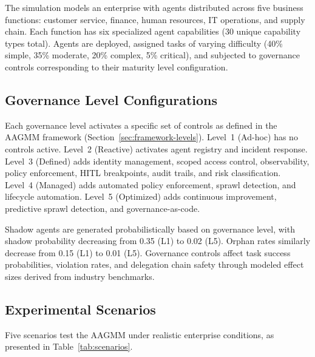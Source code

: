 \documentclass[ai,article,submit,pdftex,moreauthors]{Definitions/mdpi}
\begin{document}
The simulation models an enterprise with agents distributed across five business functions: customer service, finance, human resources, IT operations, and supply chain. Each function has six specialized agent capabilities (30 unique capability types total). Agents are deployed, assigned tasks of varying difficulty (40\% simple, 35\% moderate, 20\% complex, 5\% critical), and subjected to governance controls corresponding to their maturity level configuration.

\subsection{Governance Level Configurations}\label{sec:exp-configs}

Each governance level activates a specific set of controls as defined in the AAGMM framework (Section~\ref{sec:framework-levels}). Level~1 (Ad-hoc) has no controls active. Level~2 (Reactive) activates agent registry and incident response. Level~3 (Defined) adds identity management, scoped access control, observability, policy enforcement, HITL breakpoints, audit trails, and risk classification. Level~4 (Managed) adds automated policy enforcement, sprawl detection, and lifecycle automation. Level~5 (Optimized) adds continuous improvement, predictive sprawl detection, and governance-as-code.

Shadow agents are generated probabilistically based on governance level, with shadow probability decreasing from 0.35 (L1) to 0.02 (L5). Orphan rates similarly decrease from 0.15 (L1) to 0.01 (L5). Governance controls affect task success probabilities, violation rates, and delegation chain safety through modeled effect sizes derived from industry benchmarks.

\subsection{Experimental Scenarios}\label{sec:exp-scenarios}

Five scenarios test the AAGMM under realistic enterprise conditions, as presented in Table~\ref{tab:scenarios}.
\end{document}
